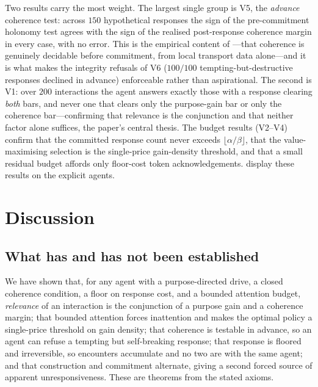 \documentclass[11pt,twocolumn,a4paper]{article}
\newcommand{\floorc}{\beta}          %
\newcommand{\att}{\alpha}            %
\begin{document}
Two results carry the most weight. The largest single group is V5, the
\emph{advance} coherence test: across $150$ hypothetical responses the sign
of the pre-commitment holonomy test agrees with the sign of the realised
post-response coherence margin in every case, with no error. This is the
empirical content of ---that coherence is genuinely
decidable before commitment, from local transport data alone---and it is
what makes the integrity refusals of V6 ($100/100$ tempting-but-destructive
responses declined in advance) enforceable rather than aspirational. The
second is V1: over $200$ interactions the agent answers exactly those with a
response clearing \emph{both} bars, and never one that clears only the
purpose-gain bar or only the coherence bar---confirming that relevance is
the conjunction and that neither factor alone suffices, the paper's central
thesis. The budget results (V2--V4) confirm that the committed response count
never exceeds $\lfloor\att/\floorc\rfloor$, that the value-maximising
selection is the single-price gain-density threshold, and that a small
residual budget affords only floor-cost token acknowledgements.
 display these results on the
explicit agents.



\section{Discussion}
\label{sec:discussion}

\subsection{What has and has not been established}

We have shown that, for any agent with a purpose-directed drive, a
closed coherence condition, a floor on response cost, and a bounded
attention budget, \emph{relevance} of an interaction is the conjunction of
a purpose gain and a coherence margin; that bounded attention forces
inattention and makes the optimal policy a single-price threshold on gain
density; that coherence is testable in advance, so an agent can refuse a
tempting but self-breaking response; that response is floored and
irreversible, so encounters accumulate and no two are with the same agent;
and that construction and commitment alternate, giving a second forced
source of apparent unresponsiveness. These are theorems from the stated
axioms.
\end{document}
